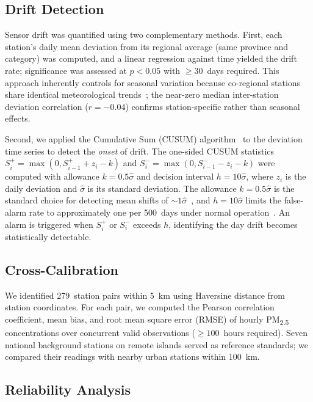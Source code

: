 \documentclass[12pt]{article}
\begin{document}
\subsection{Drift Detection}

Sensor drift was quantified using two complementary methods. First, each station's daily mean deviation from its regional average (same province and category) was computed, and a linear regression against time yielded the drift rate; significance was assessed at $p < 0.05$ with ${\geq}30$~days required. This approach inherently controls for seasonal variation because co-regional stations share identical meteorological trends~\cite{epa2017qapp, eu2008aqd}; the near-zero median inter-station deviation correlation ($r = -0.04$) confirms station-specific rather than seasonal effects.

Second, we applied the Cumulative Sum (CUSUM) algorithm~\cite{page1954cusum} to the deviation time series to detect the \emph{onset} of drift. The one-sided CUSUM statistics $S_i^+ = \max(0, S_{i-1}^+ + z_i - k)$ and $S_i^- = \max(0, S_{i-1}^- - z_i - k)$ were computed with allowance $k = 0.5\hat{\sigma}$ and decision interval $h = 10\hat{\sigma}$, where $z_i$ is the daily deviation and $\hat{\sigma}$ is its standard deviation. The allowance $k = 0.5\hat{\sigma}$ is the standard choice for detecting mean shifts of ${\sim}1\hat{\sigma}$~\cite{page1954cusum}, and $h = 10\hat{\sigma}$ limits the false-alarm rate to approximately one per 500~days under normal operation~\cite{epa2017qapp}. An alarm is triggered when $S_i^+$ or $S_i^-$ exceeds $h$, identifying the day drift becomes statistically detectable.

\subsection{Cross-Calibration}

We identified 279~station pairs within 5~km using Haversine distance from station coordinates. For each pair, we computed the Pearson correlation coefficient, mean bias, and root mean square error (RMSE) of hourly PM\textsubscript{2.5} concentrations over concurrent valid observations (${\geq}100$~hours required). Seven national background stations on remote islands served as reference standards; we compared their readings with nearby urban stations within 100~km.

\subsection{Reliability Analysis}
\end{document}
